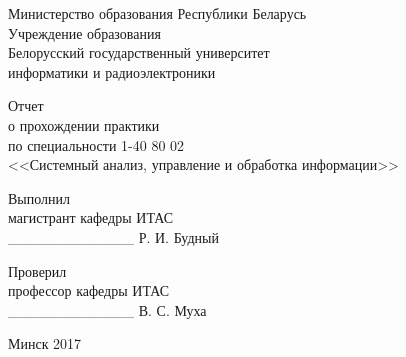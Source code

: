 \thispagestyle{empty}
\setlength{\parindent}{0mm} %

\begin{center}
  Министерство образования Республики Беларусь \\
  \smallskip
  Учреждение образования \\
  Белорусский государственный университет \\
  информатики и радиоэлектроники \\
\end{center}

\vspace{10\baselineskip}
\begin{center}
  Отчет \\
  о прохождении практики \\
  по специальности 1-40 80 02 \\
  <<Системный анализ, управление и обработка информации>>
\end{center}

\vspace{5\baselineskip}
\begin{minipage}{.45\linewidth}
\end{minipage}
\hfill
\begin{minipage}{.45\linewidth}
  Выполнил \\
  магистрант кафедры ИТАС \\
  \_\_\_\_\_\_\_\_\_\_\_\_ Р. И. Будный

  \bigskip
  Проверил \\
  профессор кафедры ИТАС \\
  \_\_\_\_\_\_\_\_\_\_\_\_ В. С. Муха
\end{minipage}

\vfill
\begin{center}
  Минск 2017
\end{center}

\setlength{\parindent}{1.25cm} %
\newpage